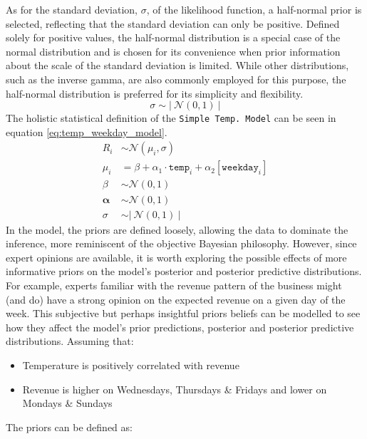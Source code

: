 As for the standard deviation, $\sigma$, of the likelihood function, a
half-normal prior is selected, reflecting that the standard deviation
can only be positive. Defined solely for positive values, the half-normal
distribution is a special case of the normal distribution and is chosen for its
convenience when prior information about the scale of the standard deviation is
limited. While other distributions, such as the inverse gamma, are also
commonly employed for this purpose, the half-normal distribution is preferred
for its simplicity and flexibility.
\begin{equation}
  \label{eq:simple_temp_sigma_prior}
  \sigma \sim \left| \ \mathcal{N}(0,1) \ \right|
\end{equation}
The holistic statistical definition of the \texttt{Simple Temp.\ Model} can be seen in 
equation \ref{eq:temp_weekday_model}.
\begin{equation}
  \label{eq:temp_weekday_model}
  \begin{split}
    R_i &\sim \mathcal{N}(\mu_i, \sigma) \\
    \mu_i &= \beta + \alpha_1 \cdot \texttt{temp}_i + \alpha_2[\texttt{weekday}_i] \\
    \beta &\sim \mathcal{N}(0, 1) \\
    \boldsymbol{\alpha} &\sim \mathcal{N}(0, 1) \\
    \sigma &\sim \left| \ \mathcal{N}(0,1) \ \right|
  \end{split}
\end{equation}
In the model, the priors are defined loosely, allowing the data to dominate the
inference, more reminiscent of the objective Bayesian philosophy. However,
since expert opinions are available, it is worth exploring the possible effects
of more informative priors on the model's posterior and posterior predictive
distributions. For example, experts familiar with the revenue pattern of the
business might (and do) have a strong opinion on the expected revenue on a
given day of the week. This subjective but perhaps insightful priors beliefs
can be modelled to see how they affect the model's prior predictions, posterior
and posterior predictive distributions. Assuming that:
\begin{itemize}
\item Temperature is positively correlated with revenue 
\item Revenue is higher on Wednesdays, Thursdays \& Fridays and lower on Mondays \& Sundays
\end{itemize}
The priors can be defined as: 
